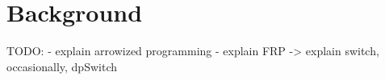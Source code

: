 \section{Background}
TODO: 
- explain arrowized programming
- explain FRP
	-> explain switch, occasionally, dpSwitch